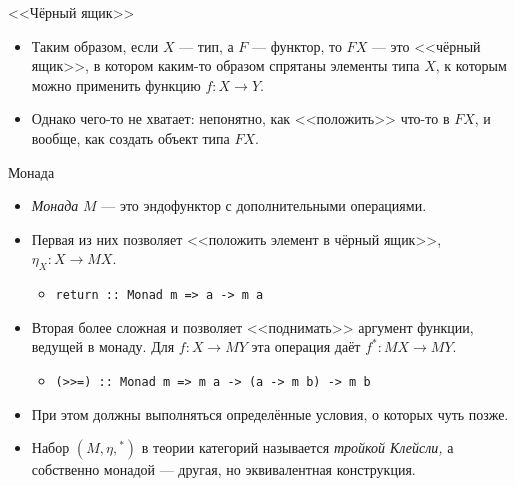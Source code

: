 \documentclass[xcolor=dvipsnames]{beamer}
\begin{document}
\begin{frame}{<<Чёрный ящик>>}

\begin{itemize}[<+->]
\item Таким образом, если $X$ --- тип, а $F$ --- функтор, то $FX$ --- это <<чёрный ящик>>, в котором каким-то образом спрятаны элементы типа $X$, к которым можно применить функцию $f \colon X \to Y$.
\begin{center}
\end{center}
\item Однако чего-то не хватает: непонятно, как <<положить>> что-то в $FX$, и вообще, как создать объект типа $FX$.
\end{itemize}
 
 
\end{frame}



\begin{frame}{Монада}
 
 \begin{itemize}[<+->]
  \item {\em Монада} $M$ --- это эндофунктор с дополнительными операциями.
  \item Первая из них позволяет <<положить элемент в чёрный ящик>>, $\eta_X \colon X \to M X$.
  \begin{itemize}
  \item \texttt{return :: Monad m => a -> m a}
  \end{itemize}
  \item Вторая более сложная и позволяет <<поднимать>> аргумент функции, ведущей в монаду. Для $f \colon X \to M Y$ эта операция даёт $f^* \colon M X \to M Y$.
  \begin{itemize}
  \item \texttt{(>>=) :: Monad m => m a -> (a -> m b) -> m b}
  \end{itemize}
  \item При этом должны выполняться определённые условия, о которых чуть позже.
  \item Набор $(M, \eta, {}^*)$ в теории категорий называется {\em тройкой Клейсли,} а собственно монадой --- другая, но эквивалентная конструкция.
 \end{itemize}
\end{frame}
\end{document}
